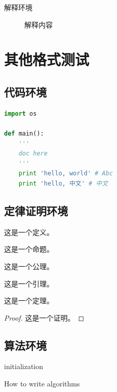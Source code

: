 \documentclass[format=draft,language=chinese,category=SDN]{hustreport}
\begin{document}
\begin{description}
    \item[解释环境]  解释内容
\end{description}

\chapter{其他格式测试}

\section{代码环境}

\begin{lstlisting}[language=python]
import os

def main():
    '''
    doc here
    '''
    print 'hello, world' # Abc
    print 'hello, 中文' # 中文
\end{lstlisting}

\section{定律证明环境}

\begin{definition}\label{def:1}
这是一个定义。
\end{definition}
\begin{proposition}\label{proposition:1}
这是一个命题。
\end{proposition}
\begin{axiom}\label{axiom:1}
这是一个公理。
\end{axiom}
\begin{lemma}\label{lemma:1}
这是一个引理。
\end{lemma}
\begin{theorem}\label{theorem:1}
这是一个定理。
\end{theorem}
\begin{proof}\label{proof:1}
这是一个证明。
\end{proof}

\section{算法环境}

\begin{algorithm}[H]
\SetAlgoLined
{}
initialization\;\label{alg_line:1}
\caption{How to write algorithms}\label{alg:1}
\end{algorithm}
\end{document}
